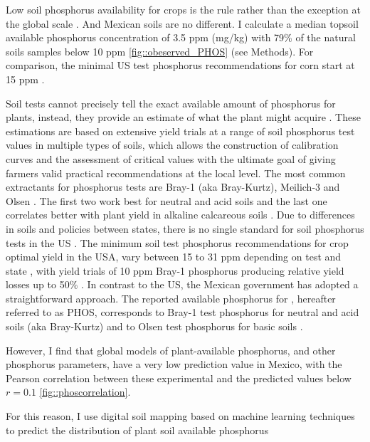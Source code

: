 Low soil phosphorus availability for crops is the rule rather than the exception at the global scale \citep{mcdowell2023,batjes2019,lyons2023}. 
And Mexican soils are no different. 
I calculate a median topsoil available phosphorus concentration of 3.5 ppm (mg/kg) with 79\% of the natural soils samples below 10 ppm \citep{paz-pellat2018} \autoref{fig::obeserved_PHOS} (see Methods). 
For comparison, the minimal US test phosphorus recommendations for corn start at 15 ppm \citep{lyons2023}.

Soil tests cannot precisely tell the exact available amount of phosphorus for plants, instead, they provide an estimate of what the plant might acquire \citep{beegle2002}. 
These estimations are based on extensive yield trials at a range of soil phosphorus test values in multiple types of soils, which allows the construction of calibration curves and the assessment of critical values with the ultimate goal of giving farmers valid practical recommendations at the local level\citep{culman2023, dodd2005, beegle2002}. 
The most common extractants for phosphorus tests are Bray-1 (aka Bray-Kurtz)\citep{bray1945}, Meilich-3 \citep{mehlich1984} and Olsen \citep{olsen1954}.
The first two work best for neutral and acid soils and the last one correlates better with plant yield in alkaline calcareous soils \citep{culman2020}.
Due to differences in soils and policies between states, there is no single standard for soil phosphorus tests in the US \citep{lyons2023}.
The minimum soil test phosphorus recommendations for crop optimal yield in the USA, vary between 15 to 31 ppm depending on test and state \citep{lyons2023}, with yield trials of 10 ppm Bray-1 phosphorus producing relative yield losses up to 50\% \citep{dodd2005}. In contrast to the US, the Mexican government has adopted a straightforward approach. 
The reported available phosphorus for \citep{paz-pellat2018}, hereafter referred to as PHOS, corresponds to Bray-1 test phosphorus for neutral and acid soils (aka Bray-Kurtz)\citep{bray1945} and to Olsen test phosphorus for basic soils \citep{olsen1954}.

However, I find that global models of plant-available phosphorus, and other phosphorus parameters, have a very low prediction value in Mexico, with the Pearson correlation between these experimental \citep{paz-pellat2018} and the predicted values below $r=0.1$ \autoref{fig::phoscorrelation}.

For this reason, I use digital soil mapping based on machine learning techniques to predict the distribution of plant soil available phosphorus

